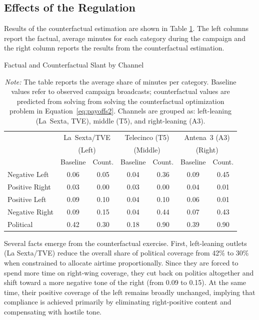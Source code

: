 \documentclass[12pt]{article}
\begin{document}
\subsection{Effects of the Regulation}

Results of the counterfactual estimation are shown in Table \ref{tab:counter}.  The left columns report the factual, average minutes for each category during the campaign and the right column reports the results from the counterfactual estimation.



\begin{table}[!htbp]
	\caption{Factual and Counterfactual Slant by Channel}
	\label{tab:counter}
	\centering\small
	\begin{tabular}{lcccccc}
		\toprule
		& \multicolumn{2}{c}{La~Sexta/TVE} & \multicolumn{2}{c}{Telecinco (T5)} & \multicolumn{2}{c}{Antena~3 (A3)} \\
		& \multicolumn{2}{c}{(Left)} & \multicolumn{2}{c}{(Middle)} & \multicolumn{2}{c}{(Right)} \\
		& Baseline & Count. & Baseline & Count. & Baseline & Count. \\
		\midrule
		Negative Left & 0.06 & 0.05 & 0.04 & 0.36 & 0.09 & 0.45 \\
		\midrule
		Positive Right & 0.03 & 0.00 & 0.03 & 0.00 & 0.04 & 0.01 \\
		\midrule
		Positive Left & 0.09 & 0.10 & 0.04 & 0.10 & 0.06 & 0.01 \\
		\midrule
		Negative Right & 0.09 & 0.15 & 0.04 & 0.44 & 0.07 & 0.43 \\
		\midrule
		Political & 0.42 & 0.30 & 0.18 & 0.90 & 0.39 & 0.90 \\
		\midrule
		\bottomrule
	\end{tabular}
	\vspace{0.5em}
	\caption*{\small \emph{Note:} The table reports the average share of minutes per category. Baseline values refer to observed campaign broadcasts; counterfactual values are predicted from solving from solving the counterfactual optimization problem in Equation~\ref{eq:payoffs2}.      Channels are grouped as: left-leaning (La~Sexta, TVE), middle (T5), and right-leaning (A3).}
\end{table}


Several facts emerge from the counterfactual exercise. First, left-leaning outlets (La Sexta/TVE) reduce the overall share of political coverage from 42\% to 30\% when constrained to allocate airtime proportionally. Since they are forced to spend more time on right-wing coverage, they cut back on politics altogether and shift  toward a more negative tone of the right (from 0.09 to 0.15). At the same time, their positive coverage of the left remains broadly unchanged, implying that compliance is achieved primarily by eliminating right-positive content and compensating with hostile tone.
\end{document}
